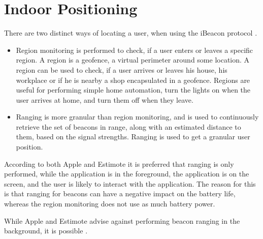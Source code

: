 \section{Indoor Positioning}
\label{sec:design:indoor-positioning}

There are two distinct ways of locating a user, 
when using the iBeacon protocol \cite{estimote:monitoring-ranging}.

\begin{itemize}
\item Region monitoring is performed to check, if a user enters or leaves a specific region. A region is a geofence, \ie a virtual perimeter around some location. A region can be used to check, if a user arrives or leaves his house, his workplace or if he is nearby a shop encapsulated in a geofence. Regions are useful for performing simple home automation, \eg turn the lights on when the user arrives at home, and turn them off when they leave.
\item Ranging is more granular than region monitoring, and is used to continuously retrieve the set of beacons in range, along with an estimated distance to them, based on the signal strengths. Ranging is used to get a granular user position.
\end{itemize}

According to both Apple and Estimote it is preferred that ranging is only performed, 
while the application is in the foreground, 
\ie the application is on the screen, 
and the user is likely to interact with the application. 
The reason for this is that ranging for beacons can have a negative impact on the battery life, 
whereas the region monitoring does not use as much battery power.

While Apple and Estimote advise against performing beacon ranging in the background, 
it is possible \cite{apple:monitoring-ibeacon,estimote:monitoring-ranging}.



